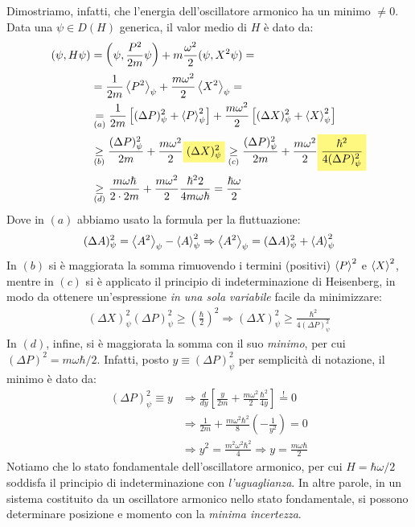 \documentclass[../../FisicaTeorica.tex]{subfiles}
\begin{document}
\begin{enumerate}
Dimostriamo, infatti, che l'energia dell'oscillatore armonico ha un minimo $\neq 0$. Data una $\psi \in D(H)$ generica, il valor medio di $H$ è dato da:
\begin{align*}
(\psi, H\psi)&=\left(\psi, \frac{P^2}{2m}\psi\right) + m\frac{\omega^2}{2}(\psi, X^2\psi) =\\
&=\frac{1}{2m}\avg{P^2}_\psi + \frac{m\omega^2}{2}\avg{X^2}_\psi =\\
&\underset{(a)}{=}
\frac{1}{2m}\left[
(\Delta P)^2_\psi + \avg{P}_\psi^2
\right ] +\frac{m\omega^2}{2}\left[
(\Delta X)^2_\psi + \avg{X}^2_\psi
\right]\\
&\underset{(b)}{\geq} \frac{(\Delta P)^2_\psi}{2m} + \frac{m\omega^2}{2}\hlc{Yellow}{(\Delta X)^2_\psi} \underset{(c)}{\geq} \frac{(\Delta P)^2_\psi}{2m} + \frac{m\omega^2}{2}\hlc{Yellow}{\frac{\hbar^2}{4(\Delta P)^2_\psi}} \\
&\underset{(d)}{\geq} \frac{m\omega \hbar }{2 \cdot 2m} + \frac{m\omega^2}{2} \frac{\hbar^2 2}{4m\omega \hbar} = \frac{\hbar\omega}{2}
\end{align*}
Dove in $(a)$ abbiamo usato la formula per la fluttuazione:
\begin{align*}
(\Delta A)^2_\psi = \left\langle{A^2}\right\rangle_\psi - \left\langle{A}\right\rangle^2_\psi \Rightarrow \left\langle{A^2}\right\rangle_\psi = (\Delta A)^2_\psi + \left\langle{A}\right\rangle^2_\psi
\end{align*}
In $(b)$ si è maggiorata la somma rimuovendo i termini (positivi) $\left\langle{P}\right\rangle^2$ e $\left\langle{X}\right\rangle^2$, mentre in $(c)$ si è applicato il principio di indeterminazione di Heisenberg, in modo da ottenere un'espressione \textit{in una sola variabile} facile da minimizzare:
\begin{align*}
(\Delta X)^2_\psi (\Delta P)^2_\psi \geq \left(\frac{\hbar}{2}\right)^2 \Rightarrow  (\Delta X)^2_\psi \geq \frac{\hbar^2}{4(\Delta P)^2_\psi}
\end{align*}
In $(d)$, infine, si è maggiorata la somma con il suo \textit{minimo}, per cui $(\Delta P)^2 = m\omega \hbar/2$. Infatti, posto $y\equiv(\Delta P)^2_\psi$ per semplicità di notazione, il minimo è dato da:
\begin{align*}
(\Delta P)^2_\psi \equiv y &\Rightarrow \frac{d}{dy}\left[
\frac{y}{2m}+\frac{m\omega^2}{2}\frac{\hbar^2}{4y}
\right] \overset{!}{=} 0\\
&\Rightarrow \frac{1}{2m} + \frac{m\omega^2 \hbar^2}{8}\left(-\frac{1}{y^2}\right)=0\\
 &\Rightarrow y^2 = \frac{m^2 \omega^2 \hbar^2}{4}\Rightarrow y =\frac{m\omega \hbar}{2}
\end{align*}
Notiamo che lo stato fondamentale dell'oscillatore armonico, per cui $H=\hbar\omega/2$ soddisfa il principio di indeterminazione con \textit{l'uguaglianza}. In altre parole, in un sistema costituito da un oscillatore armonico nello stato fondamentale, si possono determinare posizione e momento con la \textit{minima incertezza}.
\end{enumerate}
\end{document}
